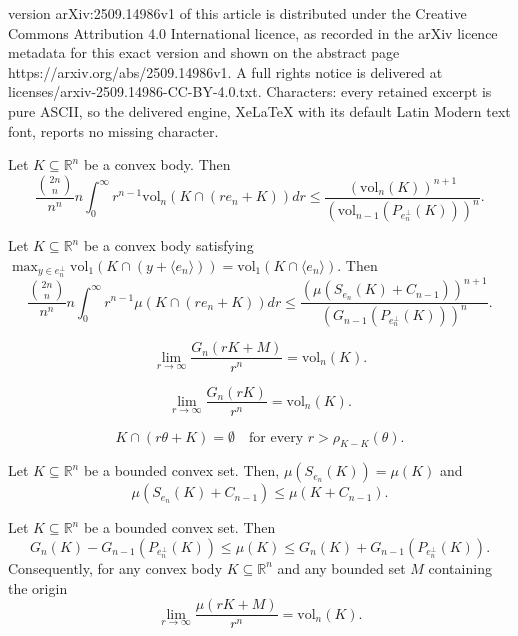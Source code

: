 \documentclass[10pt,a4paper]{amsart}
\def\R{\mathbb{R}}
\def\vol{\mathrm{vol}}
\begin{document}
version arXiv:2509.14986v1 of this article is distributed under the Creative Commons Attribution 4.0 International licence, as recorded in the arXiv licence metadata for this exact version and shown on the abstract page https://arxiv.org/abs/2509.14986v1. A full rights notice is delivered at licenses/arxiv-2509.14986-CC-BY-4.0.txt. Characters: every retained excerpt is pure ASCII, so the delivered engine, XeLaTeX with its default Latin Modern text font, reports no missing character.
\begin{thm}\label{thm:ZhangPreIntegration}
Let $K\subseteq\R^n$ be a convex body. Then
$$
\frac{{{2n}\choose{n}}}{n^n}n\int_0^\infty r^{n-1}\vol_n(K\cap(re_n+K))dr\leq\frac{(\vol_n(K))^{n+1}}{(\vol_{n-1}(P_{e_n^\perp}(K)))^n}.
$$
\end{thm}

\begin{thm}\label{thm:DiscreteZhangPreIntegration}
Let $K\subseteq\R^n$ be a convex body satisfying $\displaystyle{\max_{y\in e_n^\perp}\vol_1(K\cap(y+\langle e_n\rangle))}=\vol_1(K\cap\langle e_n\rangle)$.  Then
$$
\frac{{{2n}\choose{n}}}{n^n}n\int_0^\infty r^{n-1}\mu(K\cap(re_n+K))dr\leq\frac{(\mu(S_{e_n}(K)+C_{n-1}))^{n+1}}{(G_{n-1}(P_{e_n^\perp}(K)))^n}.
$$
\end{thm}

\begin{equation}\label{eq:ApproachingVolByDilationsWithG}
\lim_{r\to\infty}\frac{G_n(rK+M)}{r^n}=\vol_n(K).
\end{equation}

\begin{equation}\label{eq:ApproachingVolByDilationsWithGM=0}
\lim_{r\to\infty}\frac{G_n(rK)}{r^n}=\vol_n(K).
\end{equation}

\begin{equation}\label{eq:RadialFunctionDifferenceBody}
K\cap(r\theta+K)=\emptyset\quad\textrm{for every }r>\rho_{K-K}(\theta).
\end{equation}

\begin{lemma}\label{lem:MuSteiner}
Let $K\subseteq\R^n$ be a bounded convex set. Then, $\mu(S_{e_n}(K))=\mu(K)$ and
$$
\mu(S_{e_n}(K)+C_{n-1})\leq\mu(K+C_{n-1}).
$$
\end{lemma}

\begin{lemma}\label{lem:muyGn}
Let $K\subseteq\R^n$ be a bounded convex set. Then
$$
G_n(K)-G_{n-1}(P_{e_n^\perp}(K))\leq\mu(K)\leq G_n(K)+G_{n-1}(P_{e_n^\perp}(K)).
$$
Consequently, for any convex body $K\subseteq\R^n$ and any bounded set $M$ containing the origin
$$
\lim_{r\to\infty}\frac{\mu(rK+M)}{r^n}=\vol_n(K).
$$
\end{lemma}
\end{document}
